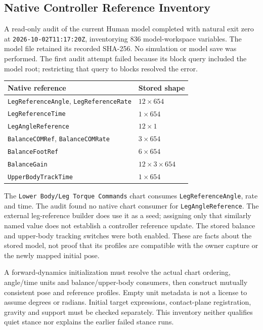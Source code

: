 \documentclass[11pt,a4paper]{article}
\begin{document}
\subsection{Native Controller Reference Inventory}
A read-only audit of the current Human model completed with natural exit zero
at \texttt{2026-10-02T11:17:20Z}, inventorying 836 model-workspace variables.
The model file retained its recorded SHA-256. No simulation or model save was
performed. The first audit attempt failed because its block query included
the model root; restricting that query to blocks resolved the error.

\begin{center}
\begin{tabular}{ll}
\toprule
Native reference & Stored shape \\
\midrule
\texttt{LegReferenceAngle}, \texttt{LegReferenceRate} & $12\times654$ \\
\texttt{LegReferenceTime} & $1\times654$ \\
\texttt{LegAngleReference} & $12\times1$ \\
\texttt{BalanceCOMRef}, \texttt{BalanceCOMRate} & $3\times654$ \\
\texttt{BalanceFootRef} & $6\times654$ \\
\texttt{BalanceGain} & $12\times3\times654$ \\
\texttt{UpperBodyTrackTime} & $1\times654$ \\
\bottomrule
\end{tabular}
\end{center}
The \texttt{Lower Body/Leg Torque Commands} chart consumes
\texttt{LegReferenceAngle}, rate and time. The audit found no native chart consumer for
\texttt{LegAngleReference}. The external leg-reference builder does use it
as a seed; assigning only that similarly named value does
not establish a controller reference update. The stored balance and upper-body
tracking switches were both enabled. These are facts about the stored model,
not proof that its profiles are compatible with the owner capture or the
newly mapped initial pose.

A forward-dynamics initialization must resolve the actual chart ordering,
angle/time units and balance/upper-body consumers, then construct mutually
consistent pose and reference profiles. Empty unit metadata is not a license
to assume degrees or radians. Initial target expressions, contact-plane
registration, gravity and support must be checked separately. This inventory
neither qualifies quiet stance nor explains the earlier failed stance runs.
\end{document}
